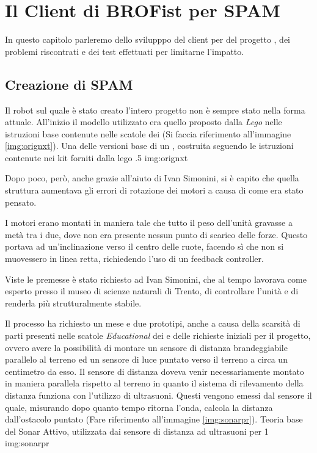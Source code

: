 \chapter{Il Client di BROFist per SPAM}
\label{chap:SPAMC}

In questo capitolo parleremo dello svilupppo del client per \SPAM{} del
progetto \BROFist{}, dei problemi riscontrati e dei test effettuati per
limitarne l'impatto.

\section{Creazione di SPAM}
Il robot sul quale è stato creato l'intero progetto non è sempre stato
nella forma attuale. All'inizio il modello utilizzato era quello proposto
dalla \emph{Lego} nelle istruzioni base contenute nelle scatole dei
\nxt{} (Si faccia riferimento all'immagine \ref{img:orignxt}).
        {Una delle versioni base di un \nxt{}, costruita seguendo le
        istruzioni contenute nei kit forniti dalla lego}
        {.5}
        {img:orignxt}

Dopo poco, però, anche grazie all'aiuto di Ivan Simonini, si è capito che
quella struttura aumentava gli errori di rotazione dei motori a causa di come era
stato pensato.

I motori erano montati in maniera tale che tutto il peso dell'unità
gravasse a metà tra i due, dove non era presente nessun punto di scarico
delle forze. Questo portava ad un'inclinazione verso il centro delle ruote,
facendo sì che non si muovessero in linea retta, richiedendo l'uso di un
feedback controller.

Viste le premesse è stato richiesto ad Ivan Simonini, che al tempo lavorava
come esperto presso il museo di scienze naturali di Trento, di controllare
l'unità e di renderla più strutturalmente stabile.

Il processo ha richiesto un mese e due prototipi, anche a causa della
scarsità di parti presenti nelle scatole \emph{Educational} dei \nxt{} e
delle richieste iniziali per il progetto, ovvero avere la possibilità di
montare un sensore di distanza brandeggiabile parallelo al terreno ed un
sensore di luce puntato verso il terreno a circa un centimetro da esso.
Il sensore di distanza doveva venir necessariamente montato in maniera
parallela rispetto al terreno in quanto il sistema di rilevamento della
distanza funziona con l'utilizzo di ultrasuoni. Questi vengono emessi dal
sensore il quale, misurando dopo quanto tempo ritorna l'onda, calcola la
distanza dall'ostacolo puntato (Fare riferimento all'immagine
\ref{img:sonarpr}).
        {Teoria base del Sonar Attivo, utilizzata dai sensore di distanza
        ad ultrasuoni per \nxt{}}
        {1}
        {img:sonarpr}

